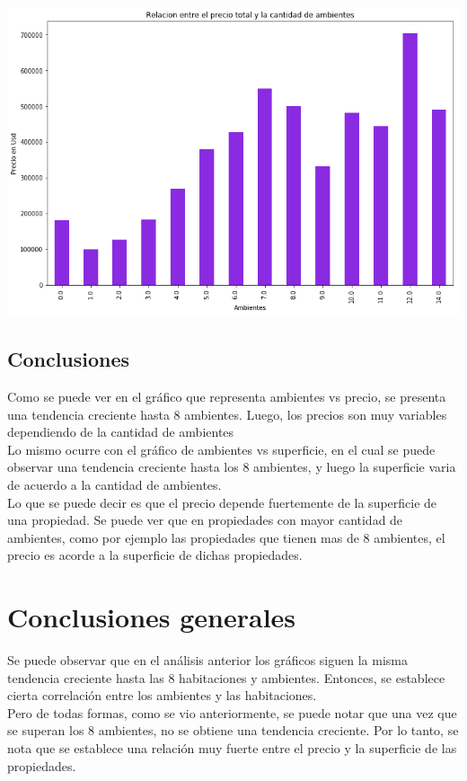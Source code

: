\documentclass[a4paper, 10pt]{article}
\begin{document}
					\begin{center}    		
    					\includegraphics[width=\textwidth]{images/RelAmbPrec}    				
					\end{center}
					
				\subsection{Conclusiones}
					
					Como se puede ver en el gráfico que representa ambientes vs precio, se presenta una tendencia creciente hasta 8 ambientes. Luego, los precios son muy variables dependiendo de la cantidad de ambientes
					\\
					Lo mismo ocurre con el gráfico de ambientes vs superficie, en el cual se puede observar una tendencia creciente hasta los 8 ambientes, y luego la superficie varia de acuerdo a la cantidad de ambientes.
					\\
					Lo que se puede decir es que el precio depende fuertemente de la superficie de una propiedad. Se puede ver que en propiedades con mayor cantidad de ambientes, como por ejemplo las propiedades que tienen mas de 8 ambientes, el precio es acorde a la superficie de dichas propiedades.
			
			\section{ Conclusiones generales }
				
				Se puede observar que en el análisis anterior los gráficos siguen la misma tendencia creciente hasta las 8 habitaciones y ambientes. Entonces, se establece cierta correlación entre los ambientes y las habitaciones. 
				\\
				Pero de todas formas, como se vio anteriormente, se puede notar que una vez que se superan los 8 ambientes, no se obtiene una tendencia creciente. Por lo tanto, se nota que se establece una relación muy fuerte entre el precio y la superficie de las propiedades.
	
\end{document}
